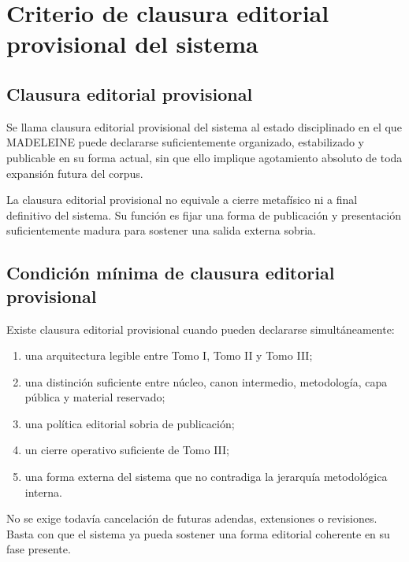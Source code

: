 \chapter{Criterio de clausura editorial provisional del sistema}

\section{Clausura editorial provisional}
\begin{definition}
Se llama clausura editorial provisional del sistema al estado disciplinado en el que MADELEINE puede declararse suficientemente organizado, estabilizado y publicable en su forma actual, sin que ello implique agotamiento absoluto de toda expansión futura del corpus.
\end{definition}

\begin{observation}
La clausura editorial provisional no equivale a cierre metafísico ni a final definitivo del sistema. Su función es fijar una forma de publicación y presentación suficientemente madura para sostener una salida externa sobria.
\end{observation}

\section{Condición mínima de clausura editorial provisional}
\begin{definition}
Existe clausura editorial provisional cuando pueden declararse simultáneamente:
\begin{enumerate}
  \item una arquitectura legible entre Tomo I, Tomo II y Tomo III;
  \item una distinción suficiente entre núcleo, canon intermedio, metodología, capa pública y material reservado;
  \item una política editorial sobria de publicación;
  \item un cierre operativo suficiente de Tomo III;
  \item una forma externa del sistema que no contradiga la jerarquía metodológica interna.
\end{enumerate}
\end{definition}

\begin{observation}
No se exige todavía cancelación de futuras adendas, extensiones o revisiones. Basta con que el sistema ya pueda sostener una forma editorial coherente en su fase presente.
\end{observation}

